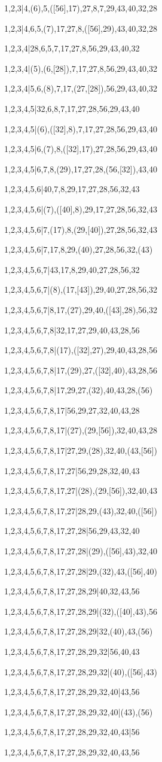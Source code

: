 \documentclass[russian]{article}
\begin{document}
1,2,3|4,(6),5,([56],17),27,8,7,29,43,40,32,28

1,2,3|4,6,5,(7),17,27,8,([56],29),43,40,32,28

1,2,3,4|28,6,5,7,17,27,8,56,29,43,40,32

1,2,3,4|(5),(6,[28]),7,17,27,8,56,29,43,40,32

1,2,3,4|5,6,(8),7,17,(27,[28]),56,29,43,40,32

1,2,3,4,5|32,6,8,7,17,27,28,56,29,43,40

1,2,3,4,5|(6),([32],8),7,17,27,28,56,29,43,40

1,2,3,4,5|6,(7),8,([32],17),27,28,56,29,43,40

1,2,3,4,5|6,7,8,(29),17,27,28,(56,[32]),43,40

1,2,3,4,5,6|40,7,8,29,17,27,28,56,32,43

1,2,3,4,5,6|(7),([40],8),29,17,27,28,56,32,43

1,2,3,4,5,6|7,(17),8,(29,[40]),27,28,56,32,43

1,2,3,4,5,6|7,17,8,29,(40),27,28,56,32,(43)

1,2,3,4,5,6,7|43,17,8,29,40,27,28,56,32

1,2,3,4,5,6,7|(8),(17,[43]),29,40,27,28,56,32

1,2,3,4,5,6,7|8,17,(27),29,40,([43],28),56,32

1,2,3,4,5,6,7,8|32,17,27,29,40,43,28,56

1,2,3,4,5,6,7,8|(17),([32],27),29,40,43,28,56

1,2,3,4,5,6,7,8|17,(29),27,([32],40),43,28,56

1,2,3,4,5,6,7,8|17,29,27,(32),40,43,28,(56)

1,2,3,4,5,6,7,8,17|56,29,27,32,40,43,28

1,2,3,4,5,6,7,8,17|(27),(29,[56]),32,40,43,28

1,2,3,4,5,6,7,8,17|27,29,(28),32,40,(43,[56])

1,2,3,4,5,6,7,8,17,27|56,29,28,32,40,43

1,2,3,4,5,6,7,8,17,27|(28),(29,[56]),32,40,43

1,2,3,4,5,6,7,8,17,27|28,29,(43),32,40,([56])

1,2,3,4,5,6,7,8,17,27,28|56,29,43,32,40

1,2,3,4,5,6,7,8,17,27,28|(29),([56],43),32,40

1,2,3,4,5,6,7,8,17,27,28|29,(32),43,([56],40)

1,2,3,4,5,6,7,8,17,27,28,29|40,32,43,56

1,2,3,4,5,6,7,8,17,27,28,29|(32),([40],43),56

1,2,3,4,5,6,7,8,17,27,28,29|32,(40),43,(56)

1,2,3,4,5,6,7,8,17,27,28,29,32|56,40,43

1,2,3,4,5,6,7,8,17,27,28,29,32|(40),([56],43)

1,2,3,4,5,6,7,8,17,27,28,29,32,40|43,56

1,2,3,4,5,6,7,8,17,27,28,29,32,40|(43),(56)

1,2,3,4,5,6,7,8,17,27,28,29,32,40,43|56

1,2,3,4,5,6,7,8,17,27,28,29,32,40,43,56
\end{document}
